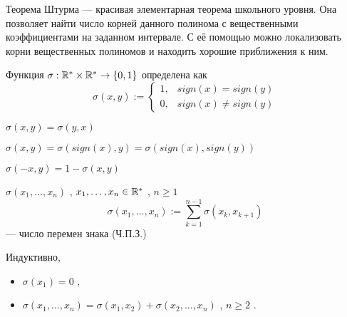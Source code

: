 



    
\SScover
    

Теорема Штурма --- красивая элементарная теорема школьного уровня. Она позволяет найти число корней данного полинома с вещественными коэффициентами на заданном интервале.
С её помощью можно локализовать корни вещественных полиномов и находить хорошие приближения к ним.

\vspace

\SSbullet 


\SSsect[def] Функция \( \sigma: \mathbb{R}^* \times \mathbb{R}^* \rightarrow \{0,1\} \) определена как
\[ \sigma(x,y) := 
   \begin{cases} 
       1, & sign(x) = sign(y) \\ 
       0, & sign(x) \neq sign(y)
   \end{cases} 
\]

\SSsect \( \sigma(x,y) = \sigma(y,x) \)

\SSsect \( \sigma(x,y) = \sigma(sign(x),y) = \sigma(sign(x),sign(y)) \)

\SSsect \( \sigma(-x,y) = 1 - \sigma(x,y) \)

\SSsect[def] \( \sigma(x_1,\dots,x_n) \) , \( x_1,\dots,x_n \in \mathbb{R}^* \) , \( n \geqslant 1 \)
\[ \sigma(x_1,\dots,x_n) := \sum_{k=1}^{n-1} \sigma(x_k,x_{k+1})
\]
--- число перемен знака (Ч.П.З.)

\SSsect Индуктивно,
\begin{itemize}[label=]
\item \( \sigma(x_1) = 0 \) ,
\item \( \sigma(x_1,\dots,x_n) = \sigma(x_1,x_2) + \sigma(x_2,\dots,x_n) \) , \( n \geqslant 2 \) .
\end{itemize}

